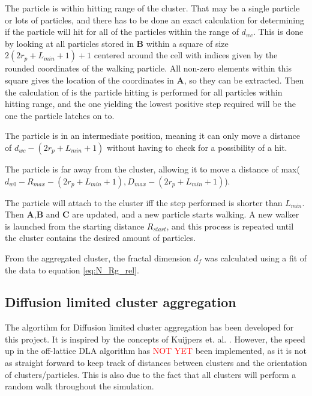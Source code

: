 \begin{itemize}
{\setlength\itemindent{1.0in}\item[$d_{wc} \le 2r_p + L_{min} + 1$:] The particle is within hitting range of the cluster. That may be a single particle or lots of particles, and there has to be done an exact calculation for determining if the particle will hit for all of the particles within the range of $d_{wc}$. This is done by looking at all particles stored in $\textbf{B}$ within a square of size $ 2(2r_p + L_{min} + 1)+1$ centered around the cell with indices given by the rounded coordinates of the walking particle. All non-zero elements within this square gives the location of the coordinates in $\textbf{A}$, so they can be extracted. Then the calculation of is the particle hitting is performed for all particles within hitting range, and the one yielding the lowest positive step required will be the one the particle latches on to. 
\item[$ 2r_p + L_{min} + 1 \le  d_{wc} \le D_{max}$:] The particle is in an intermediate position, meaning it can only move a distance of $d_{wc} - (2r_p + L_{min} + 1)$ without having to check for a possibility of a hit. 
\item[$d_{wc} = D_{max}$:] The particle is far away from the cluster, allowing it to move a distance of max($d_{w0} - R_{max} - (2r_p + L_{min} + 1), D_{max} - (2r_p + L_{min} + 1)$).}
\end{itemize}

The particle will attach to the cluster iff the step performed is shorter than $L_{min}$. Then $\textbf{A}$,$\textbf{B}$ and $\textbf{C}$ are updated, and a new particle starts walking. A new walker is launched from the starting distance $R_{start}$, and this process is repeated until the cluster contains the desired amount of particles. 

From the aggregated cluster, the fractal dimension $d_f$ was calculated using a fit of the data to equation \eqref{eq:N_Rg_rel}. 


\subsection{Diffusion limited cluster aggregation}
The algortihm for Diffusion limited cluster aggregation has been developed for this project. It is inspired by the concepts of Kuijpers et. al. \cite{Kuijpers2014841}. However, the speed up in the off-lattice DLA algorithm has \textcolor{red}{NOT YET} been implemented, as it is not as straight forward to keep track of distances between clusters and the orientation of clusters/particles. This is also due to the fact that all clusters will perform a random walk throughout the simulation. 

